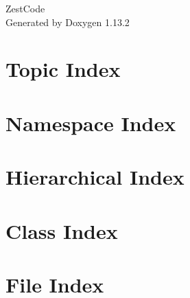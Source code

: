 \documentclass[twoside]{book}
\newcommand{\+}{\discretionary{\mbox{\scriptsize$\hookleftarrow$}}{}{}}
\newcommand{\clearemptydoublepage}{%
    \newpage{\pagestyle{empty}\cleardoublepage}%
  }
\begin{document}
  \raggedbottom
    \hypersetup{pageanchor=false,
                bookmarksnumbered=true,
                pdfencoding=unicode
               }
  \begin{titlepage}
  \vspace*{7cm}
  \begin{center}%
  {\Large Zest\+Code}\\
  \vspace*{1cm}
  {\large Generated by Doxygen 1.13.2}\\
  \end{center}
  \end{titlepage}
  \clearemptydoublepage
  \tableofcontents
  \clearemptydoublepage
  \hypersetup{pageanchor=true}








\chapter{Topic Index}

\chapter{Namespace Index}

\chapter{Hierarchical Index}

\chapter{Class Index}

\chapter{File Index}

\end{document}
